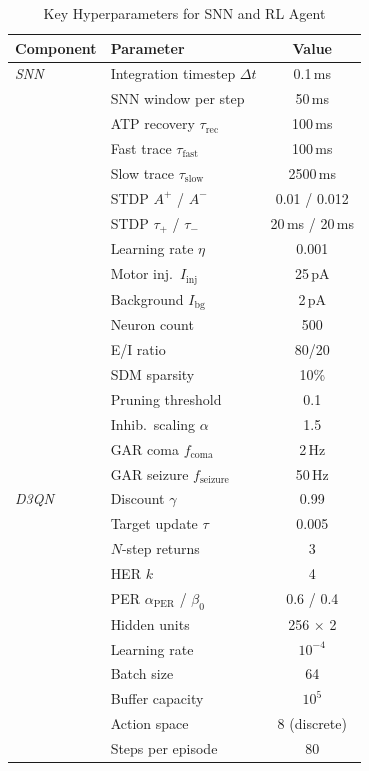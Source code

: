 \documentclass[journal,twocolumn]{IEEEtran}
\begin{document}
\begin{table}[h]
\centering
\renewcommand{\arraystretch}{1.3}
\caption{Key Hyperparameters for SNN and RL Agent}
\label{table:hyperparameters}
\begin{tabular}{llc}
\toprule
\textbf{Component} & \textbf{Parameter} & \textbf{Value} \\
\midrule
\textit{SNN} & Integration timestep $\Delta t$ & 0.1\,ms \\
 & SNN window per step & 50\,ms \\
 & ATP recovery $\tau_{\mathrm{rec}}$ & 100\,ms \\
 & Fast trace $\tau_{\mathrm{fast}}$ & 100\,ms \\
 & Slow trace $\tau_{\mathrm{slow}}$ & 2500\,ms \\
 & STDP $A^{+}$ / $A^{-}$ & 0.01 / 0.012 \\
 & STDP $\tau_{+}$ / $\tau_{-}$ & 20\,ms / 20\,ms \\
 & Learning rate $\eta$ & 0.001 \\
 & Motor inj.\ $I_{\mathrm{inj}}$ & 25\,pA \\
 & Background $I_{\mathrm{bg}}$ & 2\,pA \\
 & Neuron count & 500 \\
 & E/I ratio & 80/20 \\
 & SDM sparsity & 10\% \\
 & Pruning threshold & 0.1 \\
 & Inhib.\ scaling $\alpha$ & 1.5 \\
 & GAR coma $f_{\mathrm{coma}}$ & 2\,Hz \\
 & GAR seizure $f_{\mathrm{seizure}}$ & 50\,Hz \\
\midrule
\textit{D3QN} & Discount $\gamma$ & 0.99 \\
 & Target update $\tau$ & 0.005 \\
 & $N$-step returns & 3 \\
 & HER $k$ & 4 \\
 & PER $\alpha_{\mathrm{PER}}$ / $\beta_0$ & 0.6 / 0.4 \\
 & Hidden units & 256 $\times$ 2 \\
 & Learning rate & $10^{-4}$ \\
 & Batch size & 64 \\
 & Buffer capacity & $10^5$ \\
 & Action space & 8 (discrete) \\
 & Steps per episode & 80 \\
\bottomrule
\end{tabular}
\end{table}
\end{document}
